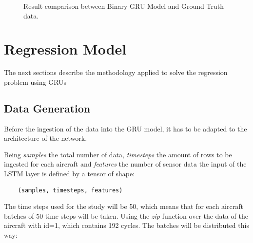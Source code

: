 \begin{figure}[H]
\begin{center}
\end{center}
\decoRule
\caption[Result comparison between Binary GRU Model and Ground Truth data]{Result comparison between Binary GRU Model and Ground Truth data.}
\label{fig:binary-gru-results}
\end{figure}


\section{Regression Model}

The next sections describe the methodology applied to solve the regression problem using GRUs


\subsection{Data Generation}

Before the ingestion of the data into the GRU model, it has to be adapted to the architecture of the network.

Being \textit{samples} the total number of data, \textit{timesteps} the amount of rows to be ingested for each aircraft and \textit{features} the number of sensor data the input of the LSTM layer is defined by a tensor of shape:

\begin{verbatim}
    (samples, timesteps, features)
\end{verbatim}

The time steps used for the study will be 50, which means that for each aircraft batches of 50 time steps will be taken.
Using the \textit{zip} function over the data of the aircraft with id=1, which contains 192 cycles. The batches will be distributed this way:

